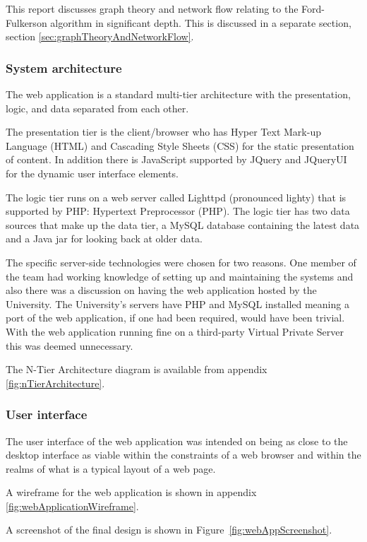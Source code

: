 This report discusses graph theory and network flow relating to the
Ford-Fulkerson algorithm in significant depth. This is discussed in a separate
section, section \ref{sec:graphTheoryAndNetworkFlow}.

\subsubsection{System architecture}

The web application is a standard multi-tier architecture with the
presentation, logic, and data separated from each other.

The presentation tier is the client/browser who has Hyper Text Mark-up Language
(HTML) and Cascading Style Sheets (CSS) for the static presentation of content.
In addition there is JavaScript supported by JQuery and JQueryUI for the dynamic
user interface elements.

The logic tier runs on a web server called Lighttpd (pronounced lighty) that is
supported by PHP: Hypertext Preprocessor (PHP). The logic tier has two data
sources that make up the data tier, a MySQL database containing the latest data
and a Java jar for looking back at older data.

The specific server-side technologies were chosen for two reasons. One member
of the team had working knowledge of setting up and maintaining the systems and
also there was a discussion on having the web application hosted by the
University. The University's servers have PHP and MySQL installed meaning a
port of the web application, if one had been required, would have been trivial.
With the web application running fine on a third-party Virtual Private Server
this was deemed unnecessary.

The N-Tier Architecture diagram is available from appendix
\ref{fig:nTierArchitecture}.

\subsubsection{User interface}

The user interface of the web application was intended on being as close to the
desktop interface as viable within the constraints of a web browser and within
the realms of what is a typical layout of a web page.

A wireframe for the web application is shown in appendix
\ref{fig:webApplicationWireframe}.

A screenshot of the final design is shown in Figure~\ref{fig:webAppScreenshot}.

